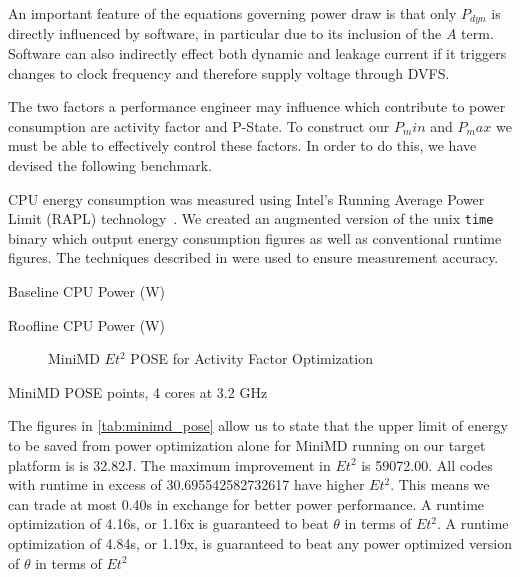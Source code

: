 An important feature of the equations governing power draw is that only $P_{dyn}$ is directly influenced by software, in particular due to its inclusion of the $A$ term. Software can also indirectly effect both dynamic and leakage current if it triggers changes to clock frequency and therefore supply voltage through DVFS.  

The two factors a performance engineer may influence which contribute to power consumption are activity factor and P-State.
To construct our $P_min$ and $P_max$ we must be able to effectively control these factors.
In order to do this, we have devised the following benchmark.

CPU energy consumption was measured using Intel's Running Average Power Limit (RAPL) technology~\cite{david:2010aa}. 
We created an augmented version of the unix \texttt{time} binary which output energy consumption figures as well as conventional runtime figures.
The techniques described in \cite{hackenberg:2013aa} were used to ensure measurement accuracy. 



\begin{table}
\centering

\caption{Baseline CPU Power (W)}
\end{table} 


\begin{table}
\centering

\caption{Roofline CPU Power (W)}
\end{table} 

\begin{figure}
\centering

\caption{MiniMD $Et^2$ POSE for Activity Factor Optimization}
\label{fig:minimd}
\end{figure}

\begin{table}
\centering

\caption{MiniMD POSE points, 4 cores at 3.2 GHz}
\label{tab:minimd_pose}
\end{table} 

The figures in \autoref{tab:minimd_pose} allow us to state that the upper limit of energy to be saved from power optimization alone for MiniMD running on our target platform is is 32.82J.
The maximum improvement in $Et^2$ is 59072.00.
All codes with runtime in excess of 30.695542582732617 have higher $Et^2$.
This means we can trade at most 0.40s in exchange for better power performance.
A runtime optimization of 4.16s, or 1.16x is guaranteed to beat $\theta$ in terms of $Et^2$. 
A runtime optimization of 4.84s, or 1.19x, is guaranteed to beat any power optimized version of $\theta$ in terms of $Et^2$ 



